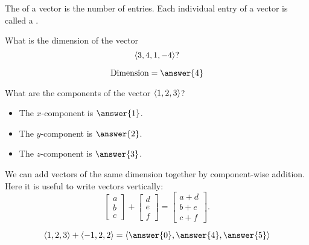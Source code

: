 \documentclass{ximera}
\begin{document}
\begin{definition}
The  of a vector is the number of entries. Each
individual entry of a vector is called a .
\end{definition}
\begin{question}
  What is the dimension of the vector 
  \[
  \left\langle 3,4,1,-4\right\rangle?
  \]
  \begin{prompt}
  \[
  \text{Dimension} = \answer{4}
  \]
  \end{prompt}
  \begin{question}
    What are the components of the vector $\left\langle 1,2,3\right\rangle$?
    \begin{prompt}
      \begin{itemize}
      \item The $x$-component is $\answer{1}$.
      \item The $y$-component is $\answer{2}$.
      \item The $z$-component is $\answer{3}$.
      \end{itemize}
    \end{prompt}
  \end{question}
\end{question}

We can add vectors of the same dimension together by component-wise
addition. Here it is useful to write vectors vertically:
\[
\begin{bmatrix}
  a\\
  b\\
  c
\end{bmatrix}
+
\begin{bmatrix}
  d\\
  e\\
  f
\end{bmatrix}
=
\begin{bmatrix}
  a+d\\
  b+e\\
  c+f
\end{bmatrix}.
\]

\begin{question}
  \[
  \vector{1,2,3}+ \vector{-1,2,2} =
  \vector{\answer{0},\answer{4},\answer{5}}
  \]
\end{question}
\end{document}
